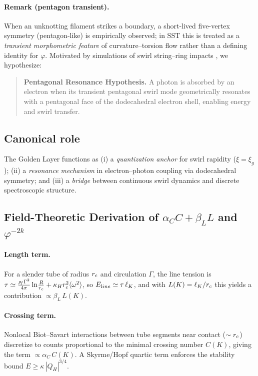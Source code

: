 \documentclass[11pt, preprint,titlepage]{revtex4-2}
\newcommand{\rhoF}{\rho_{\!f}}      %
\begin{document}
	\paragraph*{Remark (pentagon transient).}
	When an unknotting filament strikes a boundary, a short-lived five-vertex symmetry (pentagon-like) is empirically observed; in SST this is treated as a \emph{transient morphometric feature} of curvature–torsion flow rather than a defining identity for \(\varphi\). Motivated by simulations of swirl string–ring impacts \cite{orlandi1993vortex}, we hypothesize:
	\begin{quote}
		\textbf{Pentagonal Resonance Hypothesis.}
		A photon is absorbed by an electron when its transient pentagonal swirl mode geometrically resonates with a pentagonal face of the dodecahedral electron shell, enabling energy and swirl transfer.
	\end{quote}

	\subsection{Canonical role}
	The Golden Layer functions as (i) a \emph{quantization anchor} for swirl rapidity (\(\xi=\xi_g\)); (ii) a \emph{resonance mechanism} in electron–photon coupling via dodecahedral symmetry; and (iii) a \emph{bridge} between continuous swirl dynamics and discrete spectroscopic structure.

	\subsection{Field-Theoretic Derivation of \texorpdfstring{$\alpha_C C+\beta_{\!L} L$}{alpha_C C + beta_L L} and \texorpdfstring{$\varphi^{-2k}$}{phi^{-2k}}}
	\paragraph*{Length term.}
	For a slender tube of radius \(r_c\) and circulation \(\Gamma\), the line tension is
	\(
	\tau\simeq \frac{\rhoF\Gamma^2}{4\pi}\ln\!\frac{R}{\rc}+\kappa_H \rc^2\langle\omega^2\rangle
	\),
	so \(E_{\textrm line}\simeq \tau\,\ell_K\),
	and with \(L(K)=\ell_K/r_c\) this yields a contribution \(\propto \beta_{\!L}\,L(K)\).

	\paragraph*{Crossing term.}
	Nonlocal Biot--Savart interactions between tube segments near contact (\(\sim r_c\)) discretize to counts proportional to the minimal crossing number \(C(K)\), giving
	the term \(\propto \alpha_C\,C(K)\). A Skyrme/Hopf quartic term enforces the stability bound \(E\ge \kappa\,|Q_H|^{3/4}\).
\end{document}
